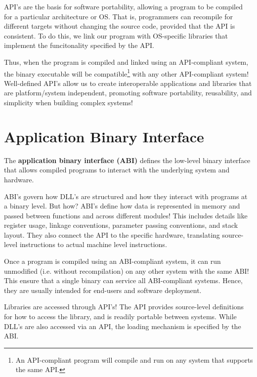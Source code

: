 \documentclass{report}
\newcommand{\corollaryBegin}[1]{\begin{tcolorbox}[colback=teal!5!white,colframe=black!75!teal,title={Corollary:
      #1}]}
\newcommand{\corollaryEnd}{\end{tcolorbox}}
\begin{document}
API's are the basis for software portability, allowing a program to be compiled for a particular
architecture or OS. That is, programmers can recompile for different targets without changing the source
code, provided that the API is consistent. To do this, we link our program with OS-specific
libraries that implement the funcitonality specified by the API.

Thus, when the program is compiled and linked using an API-compliant system, the binary executable
will be compatible\footnote{An API-compliant program will compile and run on any system that
  supports the same API.} with any other API-compliant system! Well-defined API's allow us to create
interoperable applications and libraries that are platform/system independent, promoting software
portability, reusability, and simplicity when building complex systems!





\section{Application Binary Interface}
\label{sec:ABIS}
\begin{tcolorbox}[title=Definition: Application Binary Interface]
  The \textbf{application binary interface (ABI)} defines the low-level binary interface that allows
  compiled programs to interact with the underlying system and hardware.
\end{tcolorbox}

ABI's govern how DLL's are structured and how they interact with programs at a binary level. But
how? ABI's define how data is represented in memory and passed between functions and across
different modules! This includes details like register usage, linkage conventions, parameter passing
conventions, and stack layout. They also connect the API to the specific hardware, translating
source-level instructions to actual machine level instructions.

Once a program is compiled using an ABI-compliant system, it can run unmodified (i.e. without
recompilation) on any other system with the same ABI! This ensure that a single binary can service 
all ABI-compliant systems. Hence, they are usually intended for end-users and software deployment.

\corollaryBegin{Libraries}
Libraries are accessed through API's! The API provides source-level definitions for how to access
the library, and is readily portable between systems. While DLL's are also accessed via an API, the
loading mechanism is specified by the ABI.
\corollaryEnd
\end{document}
